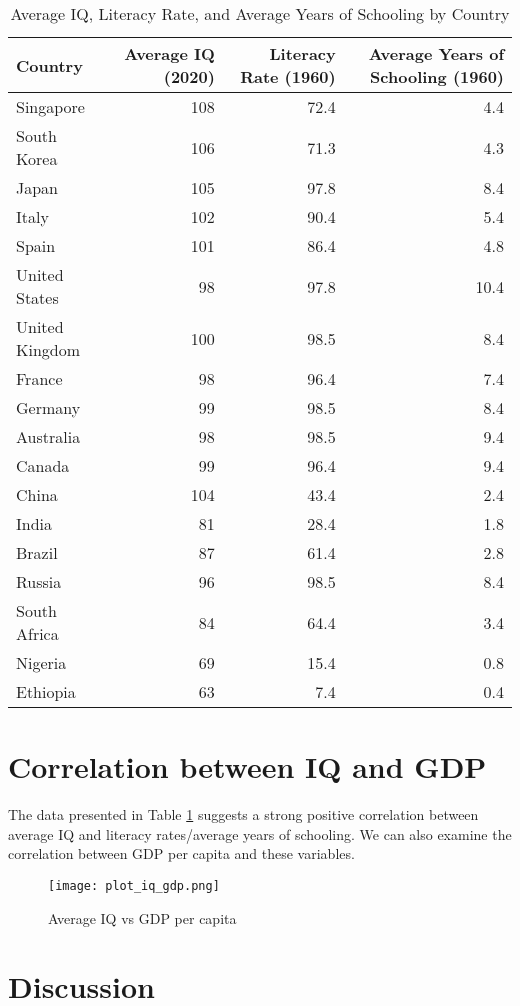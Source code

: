 \documentclass{article}
\begin{document}
\begin{table}[h!]
\centering
\begin{tabular}{lrrr}
\toprule
Country & Average IQ (2020) & Literacy Rate (1960) & Average Years of Schooling (1960) \\
\midrule
Singapore &108 &72.4 &4.4 \\
South Korea &106 &71.3 &4.3 \\
Japan &105 &97.8 &8.4 \\
Italy &102 &90.4 &5.4 \\
Spain &101 &86.4 &4.8 \\
United States &98 &97.8 &10.4 \\
United Kingdom &100 &98.5 &8.4 \\
France &98 &96.4 &7.4 \\
Germany &99 &98.5 &8.4 \\
Australia &98 &98.5 &9.4 \\
Canada &99 &96.4 &9.4 \\
China &104 &43.4 &2.4 \\
India &81 &28.4 &1.8 \\
Brazil &87 &61.4 &2.8 \\
Russia &96 &98.5 &8.4 \\
South Africa &84 &64.4 &3.4 \\
Nigeria &69 &15.4 &0.8 \\
Ethiopia &63 &7.4 &0.4 \\
\bottomrule
\end{tabular}
\caption{Average IQ, Literacy Rate, and Average Years of Schooling by Country}
\label{tab:iq_literacy}
\end{table}

\section{Correlation between IQ and GDP}

The data presented in Table \ref{tab:iq_literacy} suggests a strong positive correlation between average IQ and literacy rates/average years of schooling. We can also examine the correlation between GDP per capita and these variables.

\begin{figure}[h!]
\centering
\texttt{[image: plot\_iq\_gdp.png]}
\caption{Average IQ vs GDP per capita}
\label{fig:iq_gdp}
\end{figure}

\section{Discussion}
\end{document}
